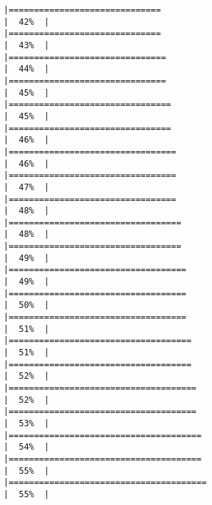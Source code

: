 \documentclass[
]{book}
\begin{document}
\begin{verbatim}
|==============================                                        |  42%  |                                                                              |==============================                                        |  43%  |                                                                              |===============================                                       |  44%  |                                                                              |===============================                                       |  45%  |                                                                              |================================                                      |  45%  |                                                                              |================================                                      |  46%  |                                                                              |=================================                                     |  46%  |                                                                              |=================================                                     |  47%  |                                                                              |=================================                                     |  48%  |                                                                              |==================================                                    |  48%  |                                                                              |==================================                                    |  49%  |                                                                              |===================================                                   |  49%  |                                                                              |===================================                                   |  50%  |                                                                              |===================================                                   |  51%  |                                                                              |====================================                                  |  51%  |                                                                              |====================================                                  |  52%  |                                                                              |=====================================                                 |  52%  |                                                                              |=====================================                                 |  53%  |                                                                              |======================================                                |  54%  |                                                                              |======================================                                |  55%  |                                                                              |=======================================                               |  55%  |                                                                              
\end{verbatim}
\end{document}
